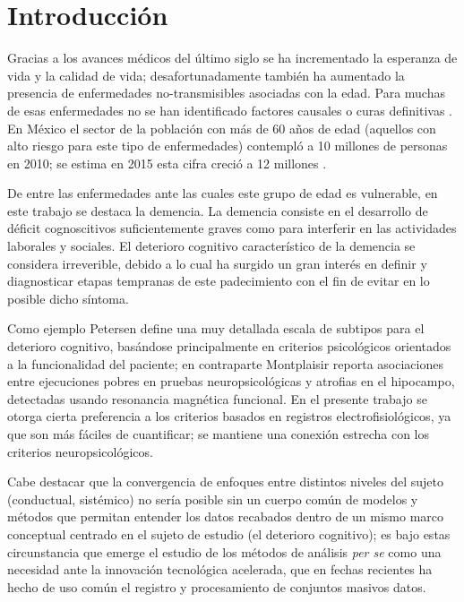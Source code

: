 
\chapter{Introducción}

Gracias a los avances médicos del último siglo se ha incrementado la esperanza de vida y la 
calidad de vida; desafortunadamente también ha aumentado la presencia de enfermedades 
no-transmisibles asociadas con la edad. Para muchas de esas enfermedades no se han identificado 
factores causales o curas definitivas \cite{PlanAlzheimer04}.
%
En México el sector de la población con más de 60 años de edad (aquellos con alto riesgo para este
tipo de enfermedades) contempló a 10 millones de personas en 2010; se estima en 2015 esta cifra 
creció a 12 millones \cite{Censo10,Intercensal15}.

De entre las enfermedades ante las cuales este grupo de edad es vulnerable, en este trabajo se 
destaca la demencia. 
La demencia consiste en el desarrollo de déficit cognoscitivos suficientemente graves como para 
interferir en las actividades laborales y sociales.
%
El deterioro cognitivo característico de la demencia se considera irreverible, debido a lo cual 
ha surgido un gran interés en definir y diagnosticar etapas tempranas de este padecimiento con el 
fin de evitar en lo posible dicho síntoma.

%
Como ejemplo Petersen \cite{Petersen01}
define una muy detallada escala de subtipos para el deterioro cognitivo, basándose principalmente
en criterios psicológicos orientados a la funcionalidad del paciente;
%
en contraparte Montplaisir \cite{Brayet16} reporta asociaciones entre ejecuciones pobres en pruebas
neuropsicológicas y atrofias en el hipocampo, detectadas usando resonancia magnética funcional.
En el presente trabajo se otorga cierta preferencia a los criterios basados en registros 
electrofisiológicos, ya que son más fáciles de cuantificar; se mantiene una conexión 
estrecha con los criterios neuropsicológicos.





Cabe destacar que la convergencia de enfoques entre distintos niveles del sujeto (conductual, sistémico) no sería
posible sin un cuerpo común de modelos y métodos que permitan entender los datos recabados dentro
de un mismo marco conceptual centrado en el sujeto de estudio (el deterioro cognitivo);
es bajo estas circunstancia que emerge el estudio de los métodos de análisis \textit{per se}
como una necesidad ante la innovación tecnológica acelerada, que en fechas recientes ha hecho
de uso común el registro y procesamiento de conjuntos masivos datos.

